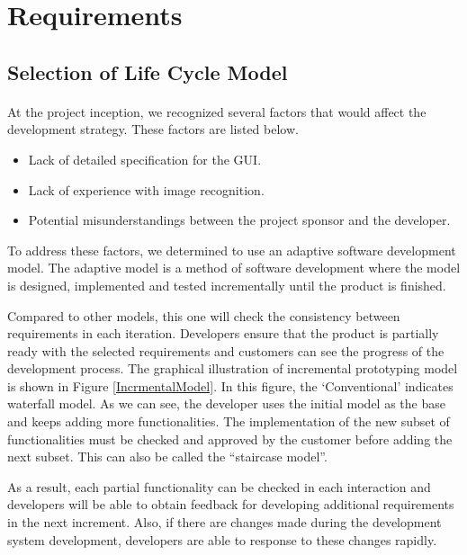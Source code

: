 \section{Requirements}
\label{sec:Requirements}

\subsection{Selection of Life Cycle Model}
\paragraph{} At the project inception, we recognized several factors that would affect the development strategy. These factors are listed below.
\begin{itemize}
\item Lack of detailed specification for the GUI.
\item Lack of experience with image recognition.
\item Potential misunderstandings between the project sponsor and the developer.
\end{itemize}
\par To address these factors, we determined to use an adaptive software development model. The adaptive model is a method of software development where the model is designed, implemented and tested incrementally until the product is finished. 
\par Compared to other models, this one will check the consistency between requirements in each iteration. Developers ensure that the product is partially ready with the selected requirements and customers can see the progress of the development process. The graphical illustration of incremental prototyping model is shown in Figure \ref{IncrmentalModel}. In this figure, the ‘Conventional’ indicates waterfall model. As we can see, the developer uses the initial model as the base and keeps adding more functionalities. The implementation of the new subset of functionalities must be checked and approved by the customer before adding the next subset. This can also be called  the “staircase model”.

\par As a result, each partial functionality can be checked in each interaction and developers will be able to obtain feedback for developing additional requirements in the next increment. Also, if there are changes made during the development system development, developers are able to response to these changes rapidly.

